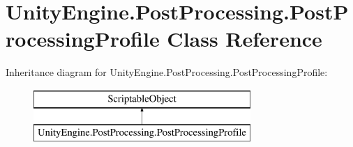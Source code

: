 \hypertarget{class_unity_engine_1_1_post_processing_1_1_post_processing_profile}{}\section{Unity\+Engine.\+Post\+Processing.\+Post\+Processing\+Profile Class Reference}
\label{class_unity_engine_1_1_post_processing_1_1_post_processing_profile}
Inheritance diagram for Unity\+Engine.\+Post\+Processing.\+Post\+Processing\+Profile\+:\begin{figure}[H]
\begin{center}
\leavevmode
\includegraphics[height=2.000000cm]{class_unity_engine_1_1_post_processing_1_1_post_processing_profile}
\end{center}
\end{figure}
